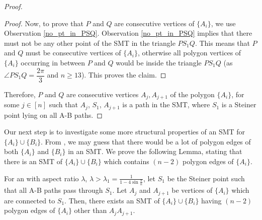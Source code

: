 \begin{proof}
\begin{proof}
    Now, to prove that $P$ and $Q$ are consecutive vertices of $\{A_i\}$, we use Observation \ref{no_pt_in_PSQ}. Observation \ref{no_pt_in_PSQ} implies that there must not be any other point of the SMT in the triangle $PS_1Q$. This means that $P$ and $Q$ must be consecutive vertices of $\{A_i\}$, otherwise all polygon vertices of $\{A_i\}$ occurring in between $P$ and $Q$ would be inside the triangle $PS_1Q$ (as $\angle PS_1Q = \dfrac {2 \pi}{3}$ and $n \ge 13$). This proves the claim.
    \end{proof}

    Therefore, $P$ and $Q$ are consecutive vertices $A_j, A_{j+1}$ of the polygon $\{A_i\}$, for some $j \in [n]$ such that $A_j$, $S_1$, $A_{j+1}$ is a path in the SMT, where $S_1$ is a Steiner point lying on all A-B paths.
\end{proof}

Our next step is to investigate some more structural properties of an SMT for $\{A_i\} \cup \{B_i\}$. From \cite{du1987steiner}, we may guess that there would be a lot of polygon edges of both $\{A_i\}$ and $\{B_i\}$ in an SMT. We prove the following Lemma, stating that there is an SMT of $\{A_i\} \cup \{B_i\}$ which contains $(n - 2)$ polygon edges of $\{A_i\}$.

\begin{lemma} \label{n-2_A_poly_edges}
    For an \smtpoly with aspect ratio $\lambda$, 
    $\lambda > \lambda_{1} = \frac{1}{1 - 4 \sin \frac{\pi}{n}}$, let $S_1$ be the Steiner point such that all A-B paths pass through $S_1$. Let $A_j$ and $A_{j+1}$ be vertices of $\{A_i\}$ which are connected to $S_1$. Then, there exists an SMT of $\{A_i\} \cup \{B_i\}$ having $(n - 2)$ polygon edges of $\{A_i\}$ other than $A_jA_{j+1}$.
\end{lemma}

